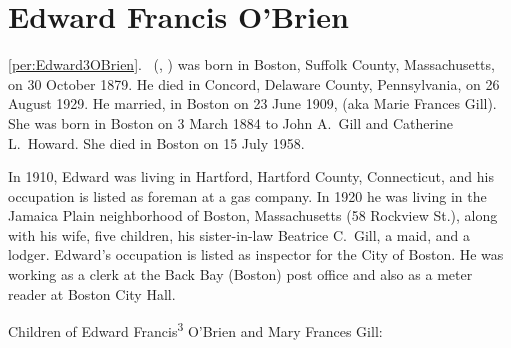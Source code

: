 \section{Edward Francis O'Brien}

\ref{per:Edward3OBrien}.\  (, ) was born in Boston, Suffolk County, Massachusetts, on 30 October 1879.\cite{Edward3OBrien2Birth} He died in Concord, Delaware County, Pennsylvania, on 26 August 1929.\cite{Edward3OBrien2Death} He married, in Boston on 23 June 1909,  (aka Marie Frances Gill).\cite{Edward3OBrien2Marriage} She was born in Boston on 3 March 1884 to John A.\ Gill and Catherine L.\ Howard.\cite{MaryGillBirth,Edward3OBrien2Marriage} She died in Boston on 15 July 1958.\cite{MaryGillDeath,MaryGillDeath2}

In 1910, Edward was living in Hartford, Hartford County, Connecticut, and his occupation is listed as foreman at a gas company.\cite{Census1910Edward3OBrien} In 1920 he was living in the Jamaica Plain neighborhood of Boston, Massachusetts (58 Rockview St.), along with his wife, five children, his sister-in-law Beatrice C.\ Gill, a maid, and a lodger. Edward's occupation is listed as inspector for the City of Boston.\cite{Census1920Edward3OBrien} He was working as a clerk at the Back Bay (Boston) post office and also as a meter reader at Boston City Hall.\cite{Edward3OBrien1920}

\begin{KidsIntro}
	Children of Edward Francis\textsuperscript{3} O'Brien and Mary Frances Gill:
\end{KidsIntro}

